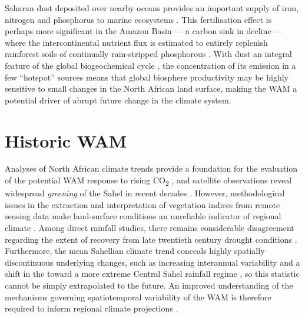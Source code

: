 \documentclass[a4paper]{article}
\begin{document}
Saharan dust deposited over nearby oceans provides an important supply of iron, nitrogen and phosphorus to marine ecosystems \parencite{prospero1996saharan, prospero1996atmospheric, guieu2002chemical, mills2004iron, bristow2010fertilizing, okin2011impacts}.
This fertilisation effect is perhaps more significant in the Amazon Basin --- a carbon sink in decline \parencite{brienen2015long} --- where the intercontinental nutrient flux is estimated to entirely replenish rainforest soils of continually rain-stripped phosphorous \parencite{swap1992saharan, bristow2010fertilizing, yu2015fertilizing}.
With dust an integral feature of the global biogeochemical cycle \parencite{ridgwell2002dust, harrison2001role, jickells2005global, mahowald2005atmospheric}, the concentration of its emission in a few ``hotspot'' sources \parencite{koren2006bodele, ben2010transport, schepanski2009saharan, knippertz2010central} means that global biosphere productivity may be highly sensitive to small changes in the North African land surface, making the WAM a potential driver of abrupt future change in the climate system.

\section{Historic WAM}
Analyses of North African climate trends provide a foundation for the evaluation of the potential WAM response to rising CO\textsubscript{2} \parencite{redelsperger2006african}, and satellite observations reveal widespread \emph{greening} of the Sahel in recent decades \parencite{olsson2005recent, dardel2014re}.
However, methodological issues in the extraction and interpretation of vegetation indices from remote sensing data make land-surface conditions an unreliable indicator of regional climate \parencite{fensholt2013assessing, dardel2014rain}.
Among direct rainfall studies, there remains considerable disagreement regarding the extent of recovery from late twentieth century drought conditions \parencite{nicholson2005question, nicholson2013west}.
Furthermore, the mean Sahellian climate trend conceals highly spatially discontinuous underlying changes, such as increasing interannual variability and a shift in the toward a more extreme Central Sahel rainfall regime \parencite{nicholson2013west, lebel2009recent, panthou2014recent}, so this statistic cannot be simply extrapolated to the future.
An improved understanding of the mechanisms governing spatiotemporal variability of the WAM is therefore required to inform regional climate projections \parencite{redelsperger2006african}.
\end{document}
